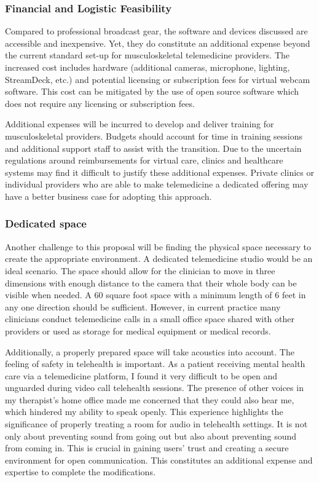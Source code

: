 \documentclass[utf8]{FrontiersinHarvard} %
\begin{document}
\subsubsection{Financial and Logistic Feasibility}

Compared to professional broadcast gear, the software and devices discussed are accessible and inexpensive. Yet, they do constitute an additional expense beyond the current standard set-up for musculoskeletal telemedicine providers. The increased cost includes hardware (additional cameras, microphone, lighting, StreamDeck, etc.) and potential licensing or subscription fees for virtual webcam software. This cost can be mitigated by the use of open source software which does not require any licensing or subscription fees.

Additional expenses will be incurred to develop and deliver training for musculoskeletal providers. Budgets should account for time in training sessions and additional support staff to assist with the transition. Due to the uncertain regulations around reimbursements for virtual care, clinics and healthcare systems may find it difficult to justify these additional expenses. Private clinics or individual providers who are able to make telemedicine a dedicated offering may have a better business case for adopting this approach.

\subsubsection{Dedicated space}

Another challenge to this proposal will be finding the physical space necessary to create the appropriate environment. A dedicated telemedicine studio would be an ideal scenario. The space should allow for the clinician to move in three dimensions with enough distance to the camera that their whole body can be visible when needed. A 60 square foot space with a minimum length of 6 feet in any one direction should be sufficient. However, in current practice many clinicians conduct telemedicine calls in a small office space shared with other providers or used as storage for medical equipment or medical records.

Additionally, a properly prepared space will take acoustics into account. The feeling of safety in telehealth is important. As a patient receiving mental health care via a telemedicine platform, I found it very difficult to be open and unguarded during video call telehealth sessions. The presence of other voices in my therapist's home office made me concerned that they could also hear me, which hindered my ability to speak openly. This experience highlights the significance of properly treating a room for audio in telehealth settings. It is not only about preventing sound from going out but also about preventing sound from coming in. This is crucial in gaining users' trust and creating a secure environment for open communication. This constitutes an additional expense and expertise to complete the modifications.
\end{document}

